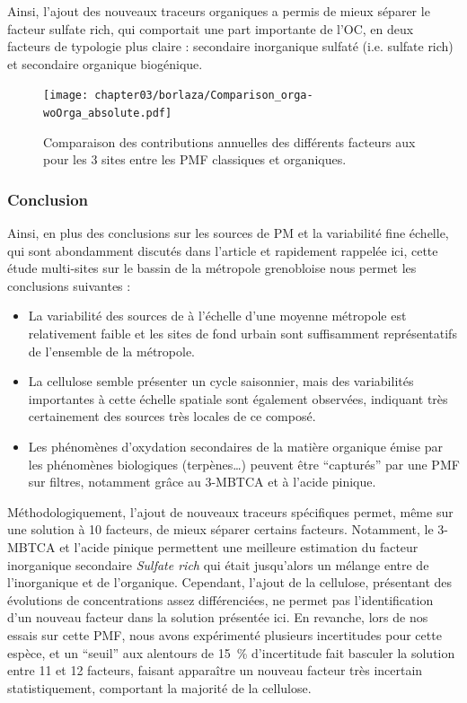 Ainsi, l'ajout des nouveaux traceurs organiques a permis de mieux séparer le facteur
sulfate rich, qui comportait une part importante de l'OC, en deux facteurs de typologie
plus claire : secondaire inorganique sulfaté (i.e. sulfate rich) et secondaire organique
biogénique.

\begin{figure}[ht]
    \centering
    \texttt{[image: chapter03/borlaza/Comparison\_orga-woOrga\_absolute.pdf]}
    \caption{Comparaison des contributions annuelles des différents facteurs aux \PMdix{}
    pour les 3 sites entre les PMF classiques et organiques.}%
    \label{fig:chapter03/borlaza/Comparison_orga-woOrga_absolute}
\end{figure}

\subsubsection{Conclusion}%
\label{ssub:conclusion_organique}

Ainsi, en plus des conclusions sur les sources de PM et la variabilité fine échelle, qui
sont abondamment discutés dans l'article et rapidement rappelée ici, cette étude
multi-sites sur le bassin de la métropole grenobloise nous permet les conclusions
suivantes :
\begin{itemize}
    \item La variabilité des sources de \PMdix{} à l'échelle d'une moyenne métropole est
        relativement faible et les sites de fond urbain sont suffisamment représentatifs
        de l'ensemble de la métropole.
    \item La cellulose semble présenter un cycle saisonnier, mais des variabilités
        importantes à cette échelle spatiale sont également observées, indiquant très
        certainement des sources très locales de ce composé.
    \item Les phénomènes d'oxydation secondaires de la matière organique émise par les
        phénomènes biologiques (terpènes…) peuvent être ``capturés'' par une PMF sur
        filtres, notamment grâce au 3-MBTCA et à l'acide pinique.
\end{itemize}

Méthodologiquement, l'ajout de nouveaux traceurs spécifiques permet, même sur une
solution à 10 facteurs, de mieux séparer certains facteurs. Notamment, le 3-MBTCA et
l'acide pinique permettent une meilleure estimation du facteur inorganique secondaire
\textit{Sulfate rich} qui était jusqu'alors un mélange entre de l'inorganique et de
l'organique.  Cependant, l'ajout de la cellulose, présentant des évolutions de
concentrations assez différenciées, ne permet pas l'identification d'un nouveau facteur
dans la solution présentée ici. En revanche, lors de nos essais sur cette PMF, nous avons
expérimenté plusieurs incertitudes pour cette espèce, et un ``seuil'' aux alentours de
\SI{15}{\percent} d'incertitude fait basculer la solution entre 11 et 12 facteurs,
faisant apparaître un nouveau facteur très incertain statistiquement, comportant la
majorité de la cellulose.

